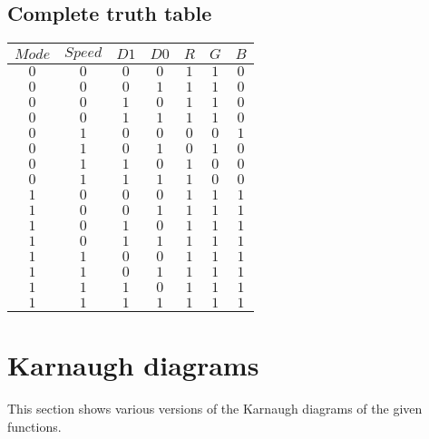 \documentclass [15pt,a4paper,twoside]{article}
\begin{document}
\subsection{Complete truth table}
\begin{center}
\begin{tabular}{cccc|ccc}
$Mode$&$Speed$&$D1$&$D0$&$R$&$G$&$B$\\
\hline
$0$&$0$&$0$&$0$&$1$&$1$&$0$\\
$0$&$0$&$0$&$1$&$1$&$1$&$0$\\
$0$&$0$&$1$&$0$&$1$&$1$&$0$\\
$0$&$0$&$1$&$1$&$1$&$1$&$0$\\
$0$&$1$&$0$&$0$&$0$&$0$&$1$\\
$0$&$1$&$0$&$1$&$0$&$1$&$0$\\
$0$&$1$&$1$&$0$&$1$&$0$&$0$\\
$0$&$1$&$1$&$1$&$1$&$0$&$0$\\
$1$&$0$&$0$&$0$&$1$&$1$&$1$\\
$1$&$0$&$0$&$1$&$1$&$1$&$1$\\
$1$&$0$&$1$&$0$&$1$&$1$&$1$\\
$1$&$0$&$1$&$1$&$1$&$1$&$1$\\
$1$&$1$&$0$&$0$&$1$&$1$&$1$\\
$1$&$1$&$0$&$1$&$1$&$1$&$1$\\
$1$&$1$&$1$&$0$&$1$&$1$&$1$\\
$1$&$1$&$1$&$1$&$1$&$1$&$1$\\

\end{tabular}
\end{center}
\section{Karnaugh diagrams}
This section shows various versions of the Karnaugh diagrams of the given functions.
\end{document}
